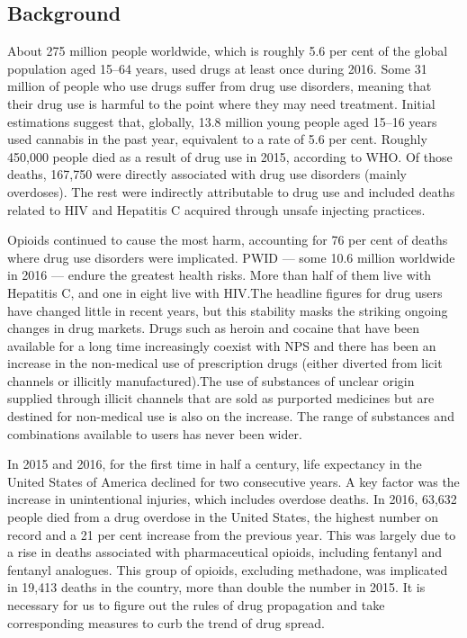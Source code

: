 \documentclass{mcmthesis}
\begin{document}
\subsection{Background}
About 275 million people worldwide, which is roughly 5.6 per cent of the global population aged 15–64 years, used drugs at least once during 2016. Some 31 million of people who use drugs suffer from drug use disorders, meaning that their drug use is harmful to the point where they may need treatment. Initial estimations suggest that, globally, 13.8 million young people aged 15–16 years used cannabis in the past year, equivalent to a rate of 5.6 per cent. 
Roughly 450,000 people died as a result of drug use in 2015, according to WHO. Of those deaths, 167,750 were directly associated with drug use disorders (mainly overdoses). The rest were indirectly attributable to drug use and included deaths related to HIV and Hepatitis C acquired through unsafe injecting practices.

Opioids continued to cause the most harm, accounting for 76 per cent of deaths where drug use disorders were implicated. PWID — some 10.6 million worldwide in 2016 — endure the greatest health risks. More than half of them live with Hepatitis C, and one in eight live with HIV.The headline figures for drug users have changed little in recent years, but this stability masks the striking ongoing changes in drug markets. Drugs such as heroin and cocaine that have been available for a long time increasingly coexist with NPS and there has been an increase in the non-medical use of prescription drugs (either diverted from licit channels or illicitly manufactured).The use of substances of unclear origin supplied through illicit channels that are sold as purported medicines but are destined for non-medical use is also on the increase. The range of substances and combinations available to users has never been wider. 

In 2015 and 2016, for the first time in half a century, life expectancy in the United States of America declined for two consecutive years. A key factor was the increase in unintentional injuries, which includes overdose deaths. In 2016, 63,632 people died from a drug overdose in the United States, the highest number on record and a 21 per cent increase from the previous year. This was largely due to a rise in deaths associated with pharmaceutical opioids, including fentanyl and fentanyl analogues. This group of opioids, excluding methadone, was implicated in 19,413 deaths in the country, more than double the number in 2015. It is necessary for us to figure out the rules of drug propagation and take corresponding measures to curb the trend of drug spread.\cite{1}
\end{document}
